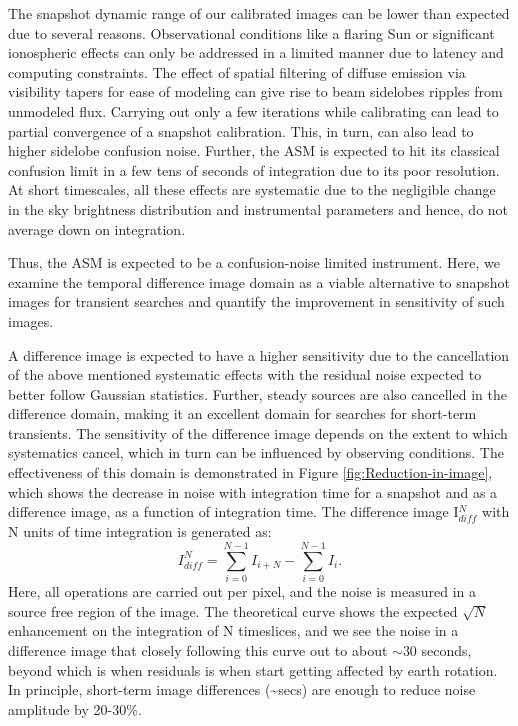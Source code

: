 \documentclass[referee]{aa}
\begin{document}
The snapshot dynamic  range of our calibrated images can  be lower than expected
due  to  several  reasons.   Observational  conditions like  a  flaring  Sun  or
significant ionospheric effects can only be addressed in a limited manner due to
latency and  computing constraints. The  effect of spatial filtering  of diffuse
emission  via visibility  tapers for  ease  of modeling  can give  rise to  beam
sidelobes ripples from unmodeled flux.  Carrying out only a few iterations while
calibrating can lead to partial  convergence of a snapshot calibration. This, in
turn, can  also lead  to higher  sidelobe confusion noise.  Further, the  ASM is
expected  to hit  its classical  confusion limit  in a  few tens  of  seconds of
integration due to its poor  resolution. At short timescales, all these effects
are systematic due  to the negligible change in  the sky brightness distribution
and instrumental parameters and hence, do not average down on integration.

Thus, the ASM is expected to  be a confusion-noise limited instrument.  Here, we
examine the temporal difference image domain as a viable alternative to snapshot
images for  transient searches and  quantify the improvement in  sensitivity of
such images.

A  difference  image  is expected  to  have  a  higher  sensitivity due  to  the
cancellation of the  above mentioned systematic effects with  the residual noise
expected to better follow Gaussian statistics.  Further, steady sources are also
cancelled in the  difference domain, making it an  excellent domain for searches
for short-term transients.   The sensitivity of the difference  image depends on
the  extent to  which systematics  cancel, which  in turn  can be  influenced by
observing  conditions.  The  effectiveness  of this  domain  is demonstrated  in
Figure  \ref{fig:Reduction-in-image}, which  shows  the decrease  in noise  with
integration time  for a  snapshot and as  a difference  image, as a  function of
integration  time.  The  difference  image  I$^N_{diff}$ with  N  units of  time
integration is generated as:
\begin{equation}
I^N_{diff} = \sum\limits_{i=0}^{N-1} I_{i+N} - \sum\limits_{i=0}^{N-1} I_i. \label{eq:diff_img}
\end{equation}
Here, all operations are  carried out per pixel, and the noise  is measured in a
source  free region  of the  image.  The  theoretical curve  shows  the expected
$\sqrt{N}$ enhancement on the integration of  N timeslices, and we see the noise
in  a difference  image  that closely  following  this curve  out  to about  $\sim$$30$
seconds, beyond which is when residuals  is when start getting affected by earth
rotation.     In    principle,     \mbox    {short-term}    image    differences
(\textasciitilde{}secs) are enough to reduce noise amplitude by 20-30\%.
\end{document}
